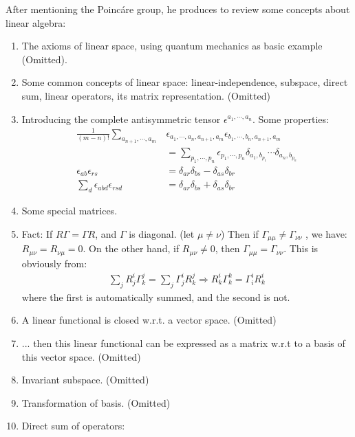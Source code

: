 \documentclass{article}
\numberwithin{equation}{subsection} %
\theoremstyle{definition}
\begin{document}
After mentioning the Poinc\'{a}re group, he produces to review some
concepts about linear algebra:
\begin{enumerate}
    \item The axioms of linear space, using quantum mechanics
        as basic example (Omitted).
    \item Some common concepts of linear space: linear-independence,
        subspace, direct sum, linear operators, its matrix representation. (Omitted)
    \item Introducing the complete antisymmetric tensor 
        $\epsilon^{a_1,\cdots,a_n}$. Some properties:
        \begin{align}
            \frac{1}{(m-n)!} \sum_{a_{n+1},\cdots, a_m}
            & \epsilon_{a_1,\cdots,a_n,a_{n+1},a_m}
            \epsilon_{b_1,\cdots,b_n,a_{n+1},a_m}\nonumber
            \\
            &= \sum_{p_1,\cdots,p_n} 
            \epsilon_{p_1,\cdots,p_n} 
                \delta_{a_1,b_{p_1}}\cdots \delta_{a_n,b_{p_n}}
                \\
            \epsilon_{ab}\epsilon_{rs} &=
                \delta_{ar}\delta_{bs}-\delta_{as}\delta_{br}
                \\
            \sum_d\epsilon_{abd}\epsilon_{rsd} &=
                \delta_{ar}\delta_{bs} + \delta_{as}\delta_{br}
        \end{align}
    \item Some special matrices.
    \item Fact: If $R\Gamma = \Gamma R$, and 
        $\Gamma$ is diagonal. (let $\mu\neq\nu$) Then if 
        $\Gamma_{\mu\mu} \neq \Gamma_{\nu\nu}$ , we have:
        $ R_{\mu\nu}=R_{\nu\mu} = 0 $.
        On the other hand, if $R_{\mu\nu}\neq 0$, then
        $\Gamma_{\mu\mu}=\Gamma_{\nu\nu}$.
        This is obviously from:
        \begin{align*}
            \sum_j R^{i}_{j}\Gamma^{j}_{k}=\sum_j\Gamma^{i}_{j} R^{j}_k
            \Longrightarrow
            R^i_k\Gamma^k_k = \Gamma^i_i R^i_k
        \end{align*}
        where the first is automatically summed, and the second is not.

    \item A linear functional is closed w.r.t. a vector space. (Omitted)
    \item ... then this linear functional can be expressed as a
        matrix w.r.t to a basis of this vector space. (Omitted)
    \item Invariant subspace. (Omitted)
    \item Transformation of basis. (Omitted)
    \item Direct sum of operators:


\end{enumerate}
\end{document}
